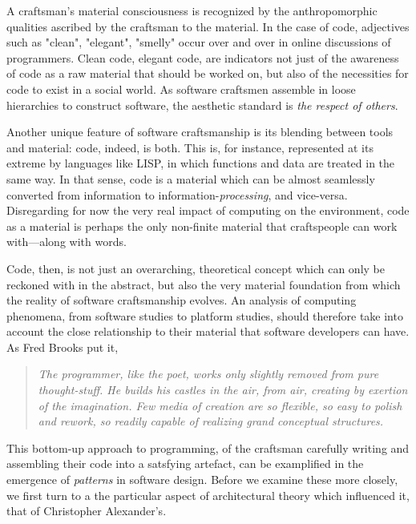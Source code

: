 \documentclass{article}
\begin{document}
A craftsman's material consciousness is recognized by the anthropomorphic qualities ascribed by the craftsman to the material. In the case of code, adjectives such as "clean", "elegant", "smelly" occur over and over in online discussions of programmers. Clean code, elegant code, are indicators not just of the awareness of code as a raw material that should be worked on, but also of the necessities for code to exist in a social world. As software craftsmen assemble in loose hierarchies to construct software, the aesthetic standard is \emph{the respect of others}\cite{abelson_structure_1979}.

Another unique feature of software craftsmanship is its blending between tools and material: code, indeed, is both. This is, for instance, represented at its extreme by languages like LISP, in which functions and data are treated in the same way\cite{mccarthy_lisp_1965}. In that sense, code is a material which can be almost seamlessly converted from information to information-\emph{processing}, and vice-versa. Disregarding for now the very real impact of computing on the environment, code as a material is perhaps the only non-finite material that craftspeople can work with—along with words.

Code, then, is not just an overarching, theoretical concept which can only be reckoned with in the abstract, but also the very material foundation from which the reality of software craftsmanship evolves. An analysis of computing phenomena, from software studies to platform studies, should therefore take into account the close relationship to their material that software developers can have. As Fred Brooks put it,

\begin{quote}
    \textit{The programmer, like the poet, works only slightly removed from pure thought-stuff. He builds his castles in the air, from air, creating by exertion of the imagination. Few media of creation are so flexible, so easy to polish and rework, so readily capable of realizing grand conceptual structures.\cite{brooks_mythical_1975}}
\end{quote}

This bottom-up approach to programming, of the craftsman carefully writing and assembling their code into a satsfying artefact, can be examplified in the emergence of \emph{patterns} in software design. Before we examine these more closely, we first turn to a the particular aspect of architectural theory which influenced it, that of Christopher Alexander's.
\end{document}
